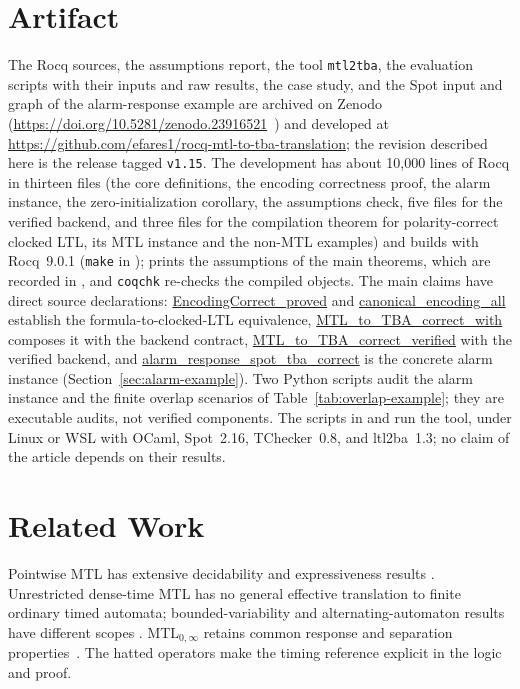 \documentclass[manuscript]{acmart}
\newcommand{\Rocqid}[1]{\url{#1}}
\begin{document}
\section{Artifact}
\label{sec:artifact}
The Rocq sources, the assumptions report, the tool \texttt{mtl2tba}, the
evaluation scripts with their inputs and raw results, the case study, and the
Spot input and graph of the alarm-response example are archived on Zenodo
(\url{https://doi.org/10.5281/zenodo.23916521}~\cite{fares_zenodo_artifact}) and
developed at \url{https://github.com/efares1/rocq-mtl-to-tba-translation}; the
revision described here is the release tagged \texttt{v1.15}. The development has about 10,000 lines of Rocq in thirteen files
(the core definitions, the encoding correctness proof, the alarm instance, the
zero-initialization corollary, the assumptions check, five files for the
verified backend, and three files for the compilation theorem for
polarity-correct clocked LTL, its MTL instance and the non-MTL examples) and
builds with
Rocq~9.0.1 (\texttt{make} in ); 
prints the assumptions of the main theorems, which are recorded in
, and \texttt{coqchk} re-checks the compiled
objects. The main claims have direct source declarations:
\Rocqid{EncodingCorrect_proved} and \Rocqid{canonical_encoding_all} establish
the formula-to-clocked-LTL equivalence, \Rocqid{MTL_to_TBA_correct_with}
composes it with the backend contract,
\Rocqid{MTL_to_TBA_correct_verified} with the verified backend, and
\Rocqid{alarm_response_spot_tba_correct} is the concrete alarm instance
(Section~\ref{sec:alarm-example}). Two Python scripts audit the alarm
instance and the finite overlap scenarios of
Table~\ref{tab:overlap-example}; they are executable audits, not verified
components. The scripts in  and  run the tool, under
Linux or WSL with OCaml, Spot~2.16, TChecker~0.8, and ltl2ba~1.3; no claim of the
article depends on their results.

\section{Related Work}
\label{sec:related}

Pointwise MTL has extensive decidability and expressiveness results
\cite{RK90,RTH96,MTLsem,ouaknine_worrell_lics05,
bouyer_chevalier_markey_fsttcs05}. Unrestricted dense-time MTL has no general
effective translation to finite ordinary timed automata; bounded-variability
and alternating-automaton results have different scopes
\cite{nickovic_piterman_formats10,BM14}. MTL$_{0,\infty}$ retains common
response and separation properties~\cite{RTH96,BDLG14}. The hatted
operators make the timing reference explicit in the logic and proof.
\end{document}
